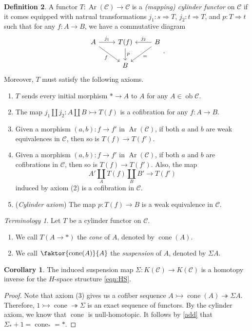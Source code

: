 \documentclass[10pt,letterpaper,cm]{nupset}
\theoremstyle{definition}
\newtheorem{definition}{Definition}[section]
\theoremstyle{theorem}
\newtheorem{corollary}[definition]{Corollary}
\theoremstyle{remark}
\newtheorem*{term}{Terminology}
\newcommand{\1}{\mathbf{1}}
\renewcommand{\c}{\mathscr{C}}
\newcommand{\0}{\vec 0}
\DeclareMathOperator{\ob}{ob}
\DeclareMathOperator{\Ar}{Ar}
\DeclareMathOperator{\cone}{cone}
\begin{document}
\begin{definition}
A functor $T: \Ar(\c) \to \c$ is a \textit{(mapping) cylinder functor} on $\c$ if it comes equipped with natrual transformations $j_1 :  s \Rightarrow T$, $j_2 : t \Rightarrow T$, and $p: T \Rightarrow t$ such that for any $f: A \to B$, we have a commutative diagram
\[
\begin{tikzcd}
A \arrow[r, "j_1"] \arrow[rd, "f"'] & T(f) \arrow[d, "p"] & B \arrow[l, "j_2"'] \arrow[ld, "="] \\
 & B & 
\end{tikzcd}
. \]
Moreover, $T$ must satisfy the following axioms.
\begin{enumerate}[label=(\arabic*)]
\item $T$ sends every initial morphism $\ast \to A$ to $A$ for any $A \in \ob \c$.
\item The map $j_1 \coprod j_2 : A \coprod B \rightarrowtail T(f)$ is a cofibration for any $f: A \to B$.
\item Given a morphism $\left(a,b\right) : f \to f'$ in $\Ar(\c)$, if both $a$ and $b$ are weak equivalences in $\c$, then so is $T(f) \to T(f').$
\item Given a morphism $\left(a,b\right) : f \to f'$ in $\Ar(\c)$, if both $a$ and $b$ are cofibrations in $\c$, then so is $T(f) \to T(f')$. Also, the map $$A' \coprod_A T(f) \coprod_B B' \to T(f')$$ induced by axiom (2) is a cofibration in $\c$.
\item {(\textit{Cylinder axiom})} The map $p: T(f) \to B$ is a weak equivalence in $\c$.
\end{enumerate}

\smallskip

\begin{term} Let $T$ be a cylinder functor on $\c$.
\begin{enumerate}
\item We call $T(A \to \ast)$ the \textit{cone} of $A$, denoted by $\cone(A)$.
\item We call $\faktor{\cone(A)}{A}$ the \textit{suspension} of $A$, denoted by $\Sigma A$. 
\end{enumerate}
\end{term}

\begin{corollary}
The induced suspension map $\Sigma : K(\c) \to K(\c)$ is a homotopy inverse for the $H$-space structure \eqref{eqn:HS}.
\end{corollary}
\begin{proof}
Note that axiom (3) gives us a cofiber sequence $A \rightarrowtail \cone(A) \twoheadrightarrow \Sigma A$. Therefore, $1 \rightarrowtail \cone \twoheadrightarrow \Sigma$ is an exact sequence of functors. By the cylinder axiom, we know that $\cone$ is null-homotopic. It follows by \cref{add} that $\Sigma_{\ast} + 1 =  \cone_{\ast} = \ast$.
\end{proof}
\end{definition}
\end{document}
